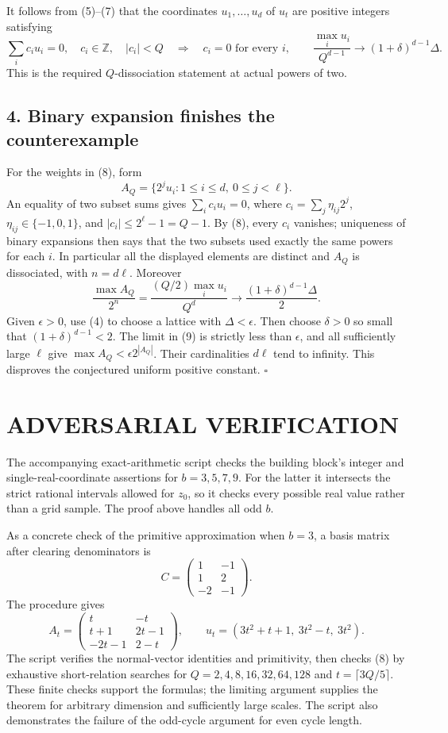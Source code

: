 It follows from (5)--(7) that the coordinates $u_1,\ldots,u_d$ of
$u_t$ are positive integers satisfying
\[
 \sum_i c_i u_i=0,\quad c_i\in\mathbb Z,\quad |c_i|<Q
 \quad\Longrightarrow\quad c_i=0\text{ for every }i,
 \qquad
 \frac{\max_i u_i}{Q^{d-1}}\longrightarrow(1+\delta)^{d-1}\Delta.
 \tag{8}
\]
This is the required $Q$-dissociation statement at actual powers of two.

\subsection{4. Binary expansion finishes the counterexample}
For the weights in (8), form
\[
 A_Q=\{2^j u_i:1\leq i\leq d,\ 0\leq j<\ell\}.
\]
An equality of two subset sums gives
$\sum_i c_i u_i=0$, where
$c_i=\sum_j\eta_{ij}2^j$, $\eta_{ij}\in\{-1,0,1\}$, and
$|c_i|\leq2^\ell-1=Q-1$. By (8), every $c_i$ vanishes; uniqueness
of binary expansions then says that the two subsets used exactly the
same powers for each $i$. In particular all the displayed elements
are distinct and $A_Q$ is dissociated, with $n=d\ell$. Moreover
\[
 \frac{\max A_Q}{2^n}
 =\frac{(Q/2)\max_i u_i}{Q^d}
 \longrightarrow\frac{(1+\delta)^{d-1}\Delta}{2}.       \tag{9}
\]
Given $\epsilon>0$, use (4) to choose a lattice with $\Delta<\epsilon$.
Then choose $\delta>0$ so small that $(1+\delta)^{d-1}<2$.
The limit in (9) is strictly less than $\epsilon$, and all sufficiently
large $\ell$ give $\max A_Q<\epsilon2^{|A_Q|}$. Their cardinalities
$d\ell$ tend to infinity. This disproves the conjectured uniform
positive constant. \hfill$\square$

\section{ADVERSARIAL VERIFICATION}
The accompanying exact-arithmetic script checks the building block's
integer and single-real-coordinate assertions for $b=3,5,7,9$.
For the latter it intersects the strict rational intervals allowed for
$z_0$, so it checks every possible real value rather than a grid sample.
The proof above handles all odd $b$.

As a concrete check of the primitive approximation when $b=3$, a basis
matrix after clearing denominators is
\[
 C=\begin{pmatrix}1&-1\\1&2\\-2&-1\end{pmatrix}.
\]
The procedure gives
\[
 A_t=\begin{pmatrix}t&-t\\t+1&2t-1\\-2t-1&2-t\end{pmatrix},
 \qquad u_t=(3t^2+t+1,\ 3t^2-t,\ 3t^2).
\]
The script verifies the normal-vector identities and primitivity, then
checks (8) by exhaustive short-relation searches for
$Q=2,4,8,16,32,64,128$ and $t=\lceil3Q/5\rceil$. These finite checks
support the formulas; the limiting argument supplies the theorem for
arbitrary dimension and sufficiently large scales. The script also
demonstrates the failure of the odd-cycle argument for even cycle length.

